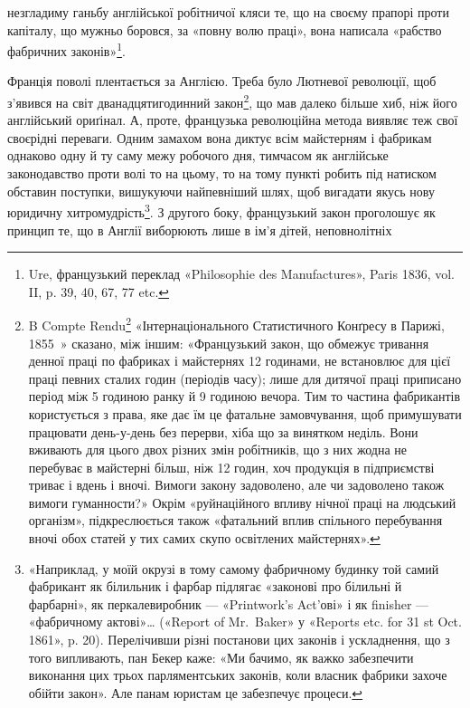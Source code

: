 \parcont{}  %
незгладиму ганьбу англійської робітничої кляси те, що на своєму
прапорі проти капіталу, що мужньо боровся, за «повну волю
праці», вона написала «рабство фабричних законів»\footnote{
Ure, французький переклад «Philosophie des Manufactures», Paris
1836, vol. II, p. 39, 40, 67, 77 etc.
}.

Франція поволі плентається за Англією. Треба було Лютневої
революції, щоб з’явився на світ дванадцятигодинний закон\footnote{
B Compte Rendu\footnote*{
звіті. 
} «Інтернаціонального Статистичного Конґресу
в Парижі, 1855~» сказано, між іншим: «Французький закон,
що обмежує тривання денної праці по фабриках і майстернях 12 годинами,
не встановлює для цієї праці певних сталих годин (періодів часу); лише
для дитячої праці приписано період між 5 годиною ранку й 9 годиною вечора.
Тим то частина фабрикантів користується з права, яке дає їм
це фатальне замовчування, щоб примушувати працювати день-у-день
без перерви, хіба що за винятком неділь. Вони вживають для цього двох
різних змін робітників, що з них жодна не перебуває в майстерні більш,
ніж 12 годин, хоч продукція в підприємстві триває і вдень і вночі. Вимоги
закону задоволено, але чи задоволено також вимоги гуманности?» Окрім
«руйнаційного впливу нічної праці на людський організм», підкреслюється
також «фатальний вплив спільного перебування вночі обох статей
у тих самих скупо освітлених майстернях».
},
що мав далеко більше хиб, ніж його англійський ориґінал. А, проте,
французька революційна метода виявляє теж свої своєрідні
переваги. Одним замахом вона диктує всім майстерням і фабрикам
однаково одну й ту саму межу робочого дня, тимчасом як
англійське законодавство проти волі то на цьому, то на тому
пункті робить під натиском обставин поступки, вишукуючи найпевніший
шлях, щоб вигадати якусь нову юридичну хитромудрість\footnote{
«Наприклад, у моїй окрузі в тому самому фабричному будинку
той самий фабрикант як білильник і фарбар підлягає «законові про білильні
й фарбарні», як перкалевиробник — «Printwork’s Act’ові» і як finisher —
«фабричному актові»\dots{} («Report of Mr.~Baker» у «Reports etc. for 31 st
Oct. 1861», p. 20). Перелічивши різні постанови цих законів і ускладнення,
що з того випливають, пан Бекер каже: «Ми бачимо, як важко забезпечити
виконання цих трьох парляментських законів, коли власник фабрики
захоче обійти закон». Але панам юристам це забезпечує процеси.
}.
З другого боку, французький закон проголошує як
принцип те, що в Англії виборюють лише в ім’я дітей, неповнолітніх
